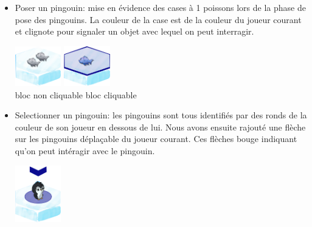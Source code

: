 \documentclass{report}
\begin{document}
\begin{itemize}
\item Poser un pingouin: mise en évidence des cases à 1 poissons lors de la phase de pose des pingouins. La couleur de la case est de la couleur du joueur courant et clignote pour signaler un objet avec lequel on peut interragir.
  \begin{center}
    
    \includegraphics[width=2cm]{image/bloc_simple.png}    
    \hspace{1cm}
    \includegraphics[width=2cm]{image/bloc_mev.png}
    \\
    bloc non cliquable \hspace{0.5cm} bloc cliquable
  \end{center}

\item Selectionner un pingouin: les pingouins sont tous identifiés par des ronds de la couleur de son joueur en dessous de lui. Nous avons ensuite rajouté une flèche sur les pingouins déplaçable du joueur courant. Ces flèches bouge indiquant qu'on peut intéragir avec le pingouin.
  \begin{center}
    \includegraphics[width=2cm]{image/bloc_pingouin.png}    
  \end{center}
\end{itemize}
\end{document}
